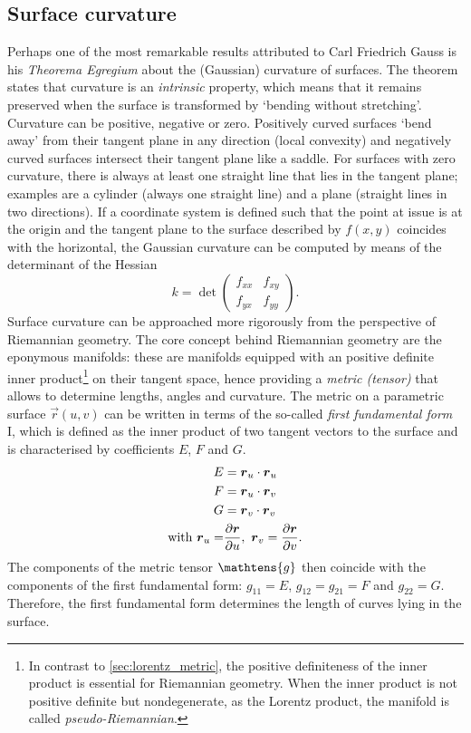 \subsection{Surface curvature}
\label{ssec:curvature}
Perhaps one of the most remarkable results attributed to Carl Friedrich Gauss is his \emph{Theorema Egregium} about the (Gaussian) curvature of surfaces. The theorem states that curvature is an \emph{intrinsic} property, which means that it remains preserved when the surface is transformed by `bending without stretching'. Curvature can be positive, negative or zero. Positively curved surfaces `bend away' from their tangent plane in any direction (local convexity) and negatively curved surfaces intersect their tangent plane like a saddle. For surfaces with zero curvature, there is always at least one straight line that lies in the tangent plane; examples are a cylinder (always one straight line) and a plane (straight lines in two directions). If a coordinate system is defined such that the point at issue is at the origin and the tangent plane to the surface described by \(f(x, y)\) coincides with the horizontal, the Gaussian curvature can be computed by means of the determinant of the Hessian \cite{Thurston1997, ONeill2006}
    \[ 
        k = \det \begin{pmatrix}
                f_{xx} & f_{xy}\\
                f_{yx} & f_{yy}
        \end{pmatrix}.
    \]
Surface curvature can be approached more rigorously from the perspective of Riemannian geometry. The core concept behind Riemannian geometry are the eponymous manifolds: these are manifolds equipped with an positive definite inner product\footnote{In contrast to \cref{sec:lorentz_metric}, the positive definiteness of the inner product is essential for Riemannian geometry. When the inner product is not positive definite but nondegenerate, as the Lorentz product, the manifold is called \emph{pseudo-Riemannian}.} on their tangent space, hence providing a \emph{metric (tensor)} that allows to determine lengths, angles and curvature. The metric on a parametric surface \(\vec{r}(u, v)\) can be written in terms of the so-called \emph{first fundamental form} I, which is defined as the inner product of two tangent vectors to the surface  and is characterised by coefficients \(E\), \(F\) and \(G\).
\begin{equation}
    \begin{split}
        E &= \vb*{r}_u \cdot \vb*{r}_u \\
        F &= \vb*{r}_u \cdot \vb*{r}_v \\
        G &= \vb*{r}_v \cdot \vb*{r}_v \\
        \text{with }  \vb*{r}_u = & \pdv{\vb*{r}}{u},\ \vb*{r}_v = \pdv{\vb*{r}}{v}.
    \end{split}
    \label{eq:first_fform}
\end{equation}
The components of the metric tensor \(\mathtens{g}\) then coincide with the components of the first fundamental form: \(g_{11} = E\), \(g_{12} = g_{21}= F\) and \(g_{22} = G\). Therefore, the first fundamental form determines the length of curves lying in the surface.

